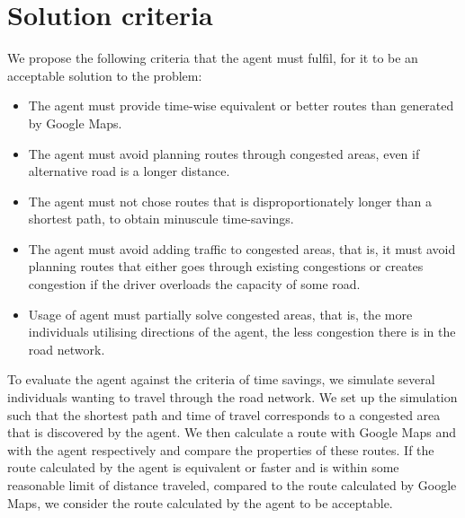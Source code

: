 \section{Solution criteria}
We propose the following criteria that the agent must fulfil, for it to be an acceptable solution to the problem:

\begin{itemize}
\item The agent must provide time-wise equivalent or better routes than generated by Google Maps.
\item The agent must avoid planning routes through congested areas, even if alternative road is a longer distance.
\item The agent must not chose routes that is disproportionately longer than a shortest path, to obtain minuscule time-savings. 

\item The agent must avoid adding traffic to congested areas, that is, it must avoid planning routes that either goes through existing congestions or creates congestion if the driver overloads the capacity of some road. 

\item Usage of agent must partially solve congested areas, that is, the more individuals utilising directions of the agent, the less congestion there is in the road network.
\end{itemize}
To evaluate the agent against the criteria of time savings, we simulate several individuals wanting to travel through the road network. We set up the simulation such that the shortest path and time of travel corresponds to a congested area that is discovered by the agent. We then calculate a route with Google Maps and with the agent respectively and compare the properties of these routes. If the route calculated by the agent is equivalent or faster and is within some reasonable limit of distance traveled, compared to the route calculated by Google Maps, we consider the route calculated by the agent to be acceptable.

